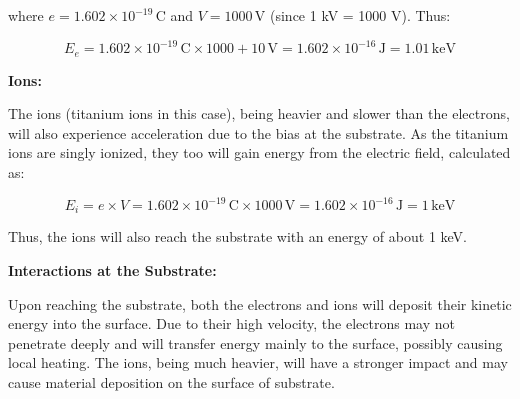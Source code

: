 \documentclass{article}
\begin{document}
\begin{itemize}
where \( e = 1.602 \times 10^{-19} \, \text{C} \) and \( V = 1000 \, \text{V} \) (since 1 kV = 1000 V). Thus:

\[
E_e = 1.602 \times 10^{-19} \, \text{C} \times 1000 + 10 \, \text{V} = 1.602 \times 10^{-16} \, \text{J} = 1.01 \, \text{keV}
\]

\textbf{Ions:}

The ions (titanium ions in this case), being heavier and slower than the electrons, will also experience acceleration due to the bias at the substrate. As the titanium ions are singly ionized, they too will gain energy from the electric field, calculated as:

\[
E_i = e \times V = 1.602 \times 10^{-19} \, \text{C} \times 1000 \, \text{V} = 1.602 \times 10^{-16} \, \text{J} = 1 \, \text{keV}
\]

Thus, the ions will also reach the substrate with an energy of about 1 keV.

\textbf{Interactions at the Substrate:}

Upon reaching the substrate, both the electrons and ions will deposit their kinetic energy into the surface. Due to their high velocity, the electrons may not penetrate deeply and will transfer energy mainly to the surface, possibly causing local heating. The ions, being much heavier, will have a stronger impact and may cause material deposition on the surface of substrate.

\end{itemize}
\end{document}
